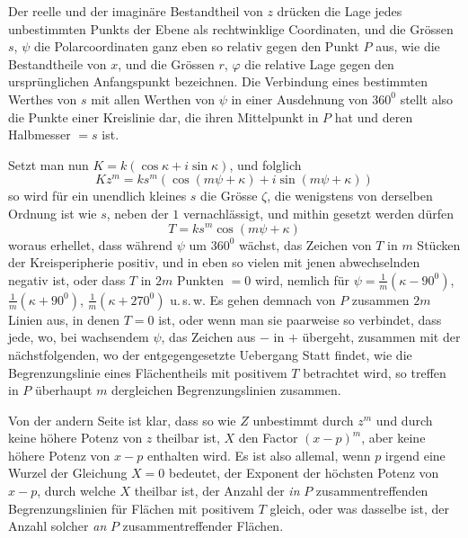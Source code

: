 Der reelle und der imaginäre Bestandtheil von $z$ drücken die Lage jedes
unbestimmten Punkts der Ebene als rechtwinklige Coordinaten, und die Grössen
$s$, $\psi$ die Polarcoordinaten ganz eben so relativ gegen den Punkt $P$ aus, wie die
Bestandtheile von $x$, und die Grössen $r$, $\varphi$ die relative Lage gegen den ursprünglichen Anfangspunkt bezeichnen. Die Verbindung eines bestimmten Werthes
von $s$ mit allen Werthen von $\psi$ in einer Ausdehnung von $360^0$ stellt also die
Punkte einer Kreislinie dar, die ihren Mittelpunkt in $P$ hat und deren Halbmesser $=s$ ist.

Setzt man nun $K=k(\cos\kappa+i\sin\kappa)$, und folglich
\[
Kz^m=ks^m(\cos(m\psi+\kappa)+i\sin(m\psi+\kappa))
\]
so wird für ein unendlich kleines $s$ die Grösse $\zeta$, die wenigstens von derselben
Ordnung ist wie $s$, neben der $1$ vernachlässigt, und mithin gesetzt werden dürfen
\[
T=ks^m\cos(m\psi+\kappa)
\]
woraus erhellet, dass während $\psi$ um $360^0$ wächst, das Zeichen von $T$ in $m$
Stücken der Kreisperipherie positiv, und in eben so vielen mit jenen abwechselnden negativ ist, oder dass $T$ in $2m$ Punkten $=0$ wird, nemlich für
$\psi=\frac{1}{m}(\kappa-90^0)$, $\frac{1}{m}(\kappa+90^0)$, $\frac{1}{m}(\kappa+270^0)$ u.\,s.\,w. Es gehen demnach von $P$ zusammen $2m$ Linien aus, in denen $T=0$ ist, oder wenn man sie paarweise so
verbindet, dass jede, wo, bei wachsendem $\psi$, das Zeichen aus $-$ in $+$ übergeht, zusammen mit der nächstfolgenden, wo der entgegengesetzte Uebergang
Statt findet, wie die Begrenzungslinie eines Flächentheils mit positivem $T$ betrachtet wird, so treffen in $P$ überhaupt $m$ dergleichen Begrenzungslinien zusammen.

Von der andern Seite ist klar, dass so wie $Z$ unbestimmt durch $z^m$ und
durch keine höhere Potenz von $z$ theilbar ist, $X$ den Factor $(x-p)^m$, aber keine
höhere Potenz von $x-p$ enthalten wird. Es ist also allemal, wenn $p$ irgend
eine Wurzel der Gleichung $X=0$ bedeutet, der Exponent der höchsten Potenz von $x-p$, durch welche $X$ theilbar ist, der Anzahl der \emph{in} $P$ zusammentreffenden Begrenzungslinien für Flächen mit positivem $T$ gleich, oder was dasselbe ist, der Anzahl solcher \emph{an} $P$ zusammentreffender Flächen.


